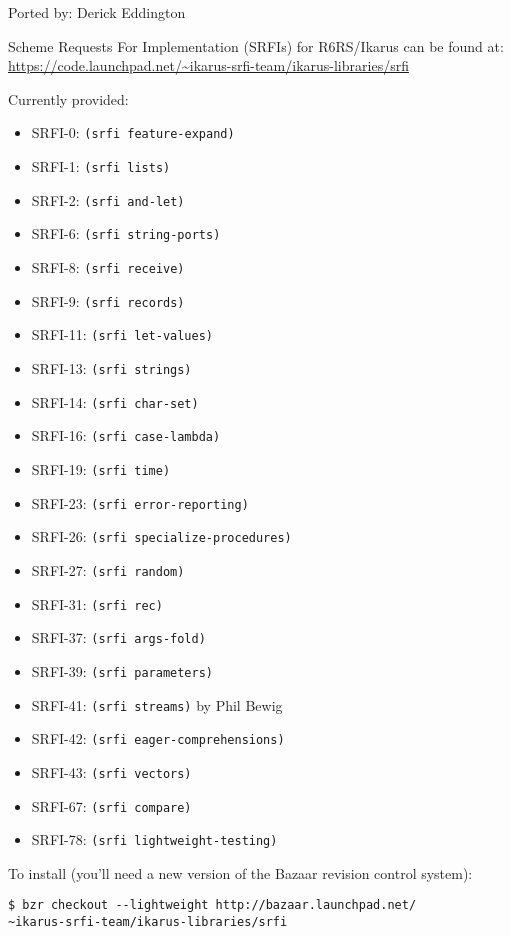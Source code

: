 \documentclass[onecolumn, 12pt, twoside, openright, dvipdfm]{book}
\begin{document}
Ported by: Derick Eddington

Scheme Requests For Implementation (SRFIs) for R6RS/Ikarus can be found
at: 
\url{https://code.launchpad.net/~ikarus-srfi-team/ikarus-libraries/srfi}

Currently provided:
\begin{itemize}
\item  SRFI-0:  \verb|(srfi feature-expand)|
\item  SRFI-1:  \verb|(srfi lists)|
\item  SRFI-2:  \verb|(srfi and-let)|
\item  SRFI-6:  \verb|(srfi string-ports)|
\item  SRFI-8:  \verb|(srfi receive)|
\item  SRFI-9:  \verb|(srfi records)|
\item  SRFI-11: \verb|(srfi let-values)|
\item  SRFI-13: \verb|(srfi strings)|
\item  SRFI-14: \verb|(srfi char-set)|
\item  SRFI-16: \verb|(srfi case-lambda)|
\item  SRFI-19: \verb|(srfi time)|
\item  SRFI-23: \verb|(srfi error-reporting)|
\item  SRFI-26: \verb|(srfi specialize-procedures)|
\item  SRFI-27: \verb|(srfi random)|
\item  SRFI-31: \verb|(srfi rec)|
\item  SRFI-37: \verb|(srfi args-fold)|
\item  SRFI-39: \verb|(srfi parameters)|
\item  SRFI-41: \verb|(srfi streams)| \hspace{.5in}by Phil Bewig
\item  SRFI-42: \verb|(srfi eager-comprehensions)|
\item  SRFI-43: \verb|(srfi vectors)|
\item  SRFI-67: \verb|(srfi compare)|
\item  SRFI-78: \verb|(srfi lightweight-testing)|
\end{itemize}

To install (you'll need a new version of the Bazaar revision
control system):
\begin{verbatim}
$ bzr checkout --lightweight http://bazaar.launchpad.net/
~ikarus-srfi-team/ikarus-libraries/srfi
\end{verbatim}
\end{document}
